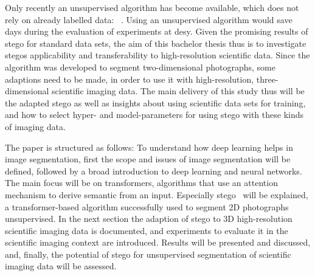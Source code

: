 Only recently an unsupervised algorithm has become available, which does not rely on already labelled data: ~\autocite{Hamilton2022}.
Using an unsupervised algorithm would save days during the evaluation of experiments at \gls{desy}.
Given the promising results of \gls{stego} for standard data sets, the aim of this bachelor thesis thus is to investigate \gls{stego}s applicability and transferability to high-resolution scientific data.
Since the algorithm was developed to segment two-dimensional photographs, some adaptions need to be made, in order to use it with high-resolution, three-dimensional scientific imaging data.
The main delivery of this study thus will be the adapted \gls{stego} as well as insights about using scientific data sets for training, and how to select hyper- and model-parameters for using \gls{stego} with these kinds of imaging data.

The paper is structured as follows:
To understand how deep learning helps in image segmentation, first the scope and issues of image segmentation will be defined, followed by a broad introduction to deep learning and neural networks.
The main focus will be on transformers, algorithms that use an attention mechanism to derive semantic from an input.
Especially \gls{stego}~\autocite{Hamilton2022} will be explained, a transformer-based algorithm successfully used to segment 2D photographs unsupervised.
In the next section the adaption of \gls{stego} to 3D high-resolution scientific imaging data is documented, and experiments to evaluate it in the scientific imaging context are introduced.
Results will be presented and discussed, and, finally, the potential of \gls{stego} for unsupervised segmentation of scientific imaging data will be assessed.
